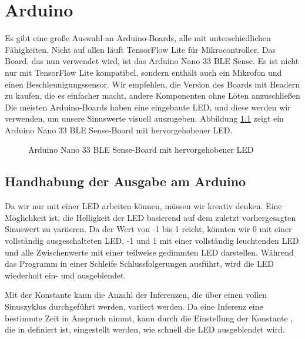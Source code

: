 %
%
%
%



\chapter{Arduino}

Es gibt eine große Auswahl an Arduino-Boards, alle mit unterschiedlichen Fähigkeiten. Nicht auf allen läuft TensorFlow Lite für Mikrocontroller. Das Board, das nun verwendet wird, ist das Arduino Nano 33 BLE Sense. Es ist nicht nur mit TensorFlow Lite kompatibel, sondern enthält auch ein Mikrofon und einen Beschleunigungssensor. Wir empfehlen, die Version des Boards mit Headern zu kaufen, die es einfacher macht, andere Komponenten ohne Löten anzuschließen Die meisten Arduino-Boards haben eine eingebaute LED, und diese werden wir verwenden, um unsere Sinuswerte visuell auszugeben. Abbildung \ref{fig:NanoLED} zeigt ein Arduino Nano 33 BLE Sense-Board mit hervorgehobener LED.

\begin{figure}
  \centering
  
  \caption{ Arduino Nano 33 BLE Sense-Board mit hervorgehobener LED}\label{fig:NanoLED}
\end{figure}


 \section{Handhabung der Ausgabe am Arduino}
 
 Da wir nur mit einer LED arbeiten können, müssen wir kreativ denken. Eine Möglichkeit ist, die Helligkeit der LED basierend auf dem zuletzt vorhergesagten Sinuswert zu variieren.  Da der Wert von -1 bis 1 reicht, könnten wir 0 mit einer vollständig ausgeschalteten LED, -1 und 1 mit einer vollständig leuchtenden LED und alle Zwischenwerte mit einer teilweise gedimmten LED darstellen. Während das Programm in einer Schleife Schlussfolgerungen ausführt, wird die LED wiederholt ein- und ausgeblendet.

Mit der Konstante  kann die Anzahl der Inferenzen, die über einen vollen Sinuszyklus durchgeführt werden, variiert werden. Da eine Inferenz eine bestimmte Zeit in Anspruch nimmt, kann durch die Einstellung der Konstante , die in  definiert ist, eingestellt werden, wie schnell die LED ausgeblendet wird.
 
